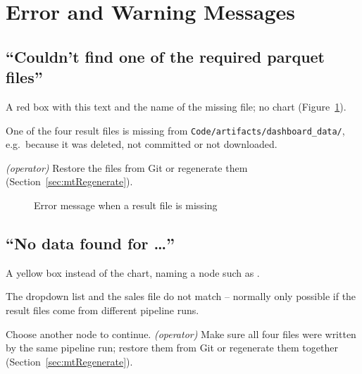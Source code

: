 \section{Error and Warning Messages}
\label{sec:tsMessageGroup}

\subsection{``Couldn't find one of the required parquet files''}
\label{sec:tsParquet}

\begin{description}[style=nextline,leftmargin=0.5cm,font=\normalfont\bfseries]
  \item[Symptom] A red box with this text and the name of the missing file; no chart (Figure~\ref{fig:tsParquet}).
  \item[Cause] One of the four result files is missing from \texttt{Code/artifacts/dashboard\_data/}, e.g.\ because it was deleted, not committed or not downloaded.
  \item[Solution] \emph{(operator)} Restore the files from Git or regenerate them (Section~\ref{sec:mtRegenerate}).
\end{description}

\begin{figure}[H]
  \centering
  \caption{Error message when a result file is missing}
  \label{fig:tsParquet}
\end{figure}

\subsection{``No data found for \dots''}
\label{sec:tsNoData}

\begin{description}[style=nextline,leftmargin=0.5cm,font=\normalfont\bfseries]
  \item[Symptom] A yellow box instead of the chart, naming a node such as .
  \item[Cause] The dropdown list and the sales file do not match -- normally only possible if the result files come from different pipeline runs.
  \item[Solution] Choose another node to continue. \emph{(operator)} Make sure all four files were written by the same pipeline run; restore them from Git or regenerate them together (Section~\ref{sec:mtRegenerate}).
\end{description}

